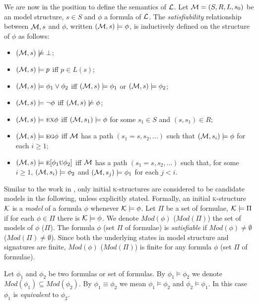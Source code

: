 \documentclass[runningheads]{llncs}
\newcommand{\Mod}{\textit{Mod}}
\newcommand{\MPK}{\textsc{k}}
\newcommand{\EXIST}{\textsc{e}}
\newcommand{\NEXT}{\textsc{x}}
\newcommand{\UNTIL}{\textsc{u}}
\newcommand{\GLOBAL}{\textsc{g}}
\begin{document}
We are now in the position to define the semantics of $\cal L$.
Let ${\cal M}=(S,R,L,s_0)$ be an model structure, $s\in S$ and $\phi$ a formula of $\cal L$.
The {\em satisfiability} relationship between ${\cal M},s$ and $\phi$,
written $({\cal M},s)\models\phi$, is inductively defined on the structure of $\phi$ as follows:
\begin{itemize}
  \item $({\cal M},s)\not\models\bot$;
  \item $({\cal M},s)\models p$ iff $p\in L(s)$;
  \item $({\cal M},s)\models \phi_1\lor\phi_2$ iff
    $({\cal M},s)\models \phi_1$ or $({\cal M},s)\models \phi_2$;
  \item $({\cal M},s)\models \neg\phi$ iff  $({\cal M},s)\not\models\phi$;
  \item $({\cal M},s)\models \EXIST\NEXT\phi$ iff
    $({\cal M},s_1)\models\phi$ for some $s_1\in S$ and $(s,s_1)\in R$;
  \item $({\cal M},s)\models \EXIST\GLOBAL\phi$ iff
    $\cal M$ has a path $(s_1=s,s_2,\ldots)$ such that
    $({\cal M},s_i)\models\phi$ for each $i\ge 1$;
  \item $({\cal M},s)\models \EXIST[\phi_1\UNTIL\phi_2]$ iff
    $\cal M$ has a path $(s_1=s,s_2,\ldots)$ such that, for some $i\ge 1$,
    $({\cal M},s_i)\models\phi_2$ and
    $({\cal M},s_j)\models\phi_1$ for each $j<i$.
\end{itemize}

Similar to the work in \cite{DBLP:journals/tcs/BrowneCG88,Bolotov:1999:JETAI},
only initial \MPK-structures are considered to be candidate models
in the following, unless explicitly stated. Formally,
an initial \MPK-structure $\cal K$ is a {\em model} of a formula $\phi$
whenever ${\cal K}\models\phi$.
Let $\Pi$ be a set of formulae, ${\cal K} \models \Pi$ if for each $\phi\in \Pi$ there is $\cal K \models \phi$.
We denote $\Mod(\phi)$  ($\Mod(\Pi)$) the set of models of $\phi$ ($\Pi$).
The formula $\phi$ (set $\Pi$ of formulae) is {\em satisfiable}
if $\Mod(\phi)\neq\emptyset$ ($\Mod(\Pi)\neq\emptyset$).
Since both the underlying states in model structure and signatures are finite, $\Mod(\phi)$ ($\Mod(\Pi)$)
is finite for any formula $\phi$ (set $\Pi$ of formulae).

Let $\phi_1$ and $\phi_2$ be two formulas or set of formulas.
By $\phi_1\models\phi_2$ we denote $\Mod(\phi_1)\subseteq\Mod(\phi_2)$.
By $\phi_1\equiv\phi_2$ we mean $\phi_1\models\phi_2$ and $\phi_2\models\phi_1$.
In this case $\phi_1$ is {\em equivalent} to $\phi_2$.
\end{document}
